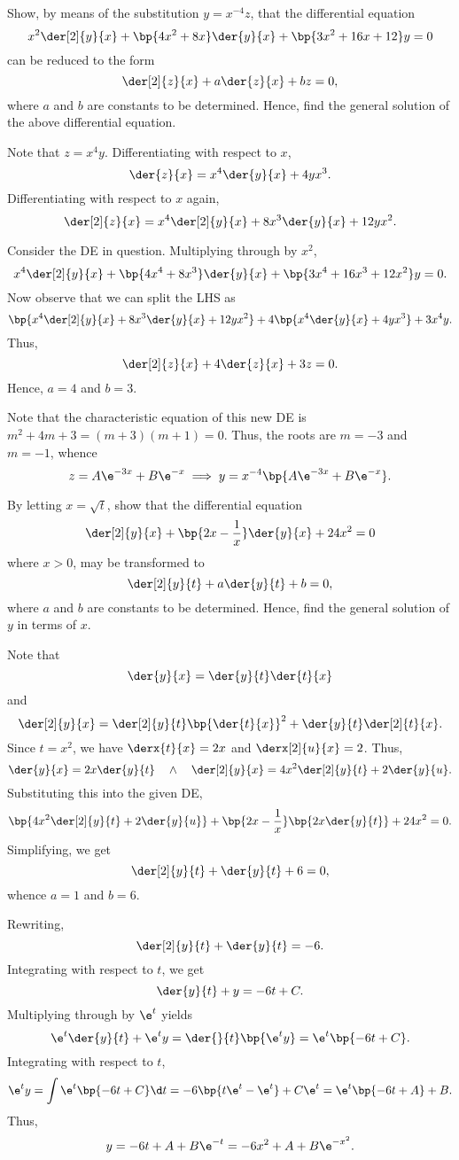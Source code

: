 \clearpage
\begin{problem}
    Show, by means of the substitution $y = x^{-4} z$, that the differential equation \[x^2 \der[2]{y}{x} + \bp{4x^2 + 8x} \der{y}{x} + \bp{3x^2 + 16x + 12} y = 0\] can be reduced to the form \[\der[2]{z}{x} + a\der{z}{x} + bz = 0,\] where $a$ and $b$ are constants to be determined. Hence, find the general solution of the above differential equation.
\end{problem}
\begin{solution}
    Note that $z = x^4y$. Differentiating with respect to $x$, \[\der{z}{x} = x^4 \der{y}{x} + 4yx^3.\] Differentiating with respect to $x$ again, \[\der[2]{z}{x} = x^4 \der[2]{y}{x} + 8x^3 \der{y}{x} + 12yx^2.\]

    Consider the DE in question. Multiplying through by $x^2$, \[x^4 \der[2]{y}{x} + \bp{4x^4 + 8x^3} \der{y}{x} + \bp{3x^4 + 16x^3 + 12x^2} y = 0.\] Now observe that we can split the LHS as \[\bp{x^4 \der[2]{y}{x} + 8x^3 \der{y}{x} + 12yx^2} + 4\bp{x^4 \der{y}{x} + 4yx^3} + 3x^4 y.\] Thus, \[\der[2]{z}{x} + 4\der{z}{x} + 3z = 0.\] Hence, $a = 4$ and $b = 3$.

    Note that the characteristic equation of this new DE is $m^2 + 4m + 3 = (m+3)(m+1) = 0$. Thus, the roots are $m =-3$ and $m =-1$, whence \[z = A\e^{-3x} + B\e^{-x} \implies y = x^{-4}\bp{A\e^{-3x} + B\e^{-x}}.\]
\end{solution}

\begin{problem}
    By letting $x = \sqrt t$, show that the differential equation \[\der[2]{y}{x} + \bp{2x - \frac1x} \der{y}{x} + 24 x^2 = 0\] where $x > 0$, may be transformed to \[\der[2]{y}{t} + a \der{y}{t} + b = 0,\] where $a$ and $b$ are constants to be determined. Hence, find the general solution of $y$ in terms of $x$.
\end{problem}
\begin{solution}
    Note that \[\der{y}{x} = \der{y}{t} \der{t}{x}\] and \[\der[2]{y}{x} = \der[2]{y}{t} \bp{\der{t}{x}}^2 + \der{y}{t} \der[2]{t}{x}.\] Since $t = x^2$, we have $\derx{t}{x} = 2x$ and $\derx[2]{u}{x} = 2$. Thus, \[\der{y}{x} = 2x \der{y}{t} \quad \land \quad \der[2]{y}{x} = 4x^2 \der[2]{y}{t} + 2 \der{y}{u}.\] Substituting this into the given DE, \[\bp{4x^2 \der[2]{y}{t} + 2 \der{y}{u}} + \bp{2x - \frac1x} \bp{2x \der{y}{t}} + 24x^2 = 0.\] Simplifying, we get \[\der[2]{y}{t} + \der{y}{t} + 6 = 0,\] whence $a = 1$ and $b = 6$.

    Rewriting, \[\der[2]{y}{t} + \der{y}{t} = -6.\] Integrating with respect to $t$, we get \[\der{y}{t} + y = -6t + C.\] Multiplying through by $\e^t$ yields \[\e^t \der{y}{t} + \e^t y = \der{}{t} \bp{\e^t y} = \e^t \bp{-6t + C}.\] Integrating with respect to $t$, \[\e^t y = \int \e^t \bp{-6t + C} \d t = -6 \bp{t\e^t - \e^t} + C\e^t = \e^t \bp{-6t + A} + B.\] Thus, \[y = -6t + A + B\e^{-t} = -6x^2 + A + B\e^{-x^2}.\]

\end{solution}

